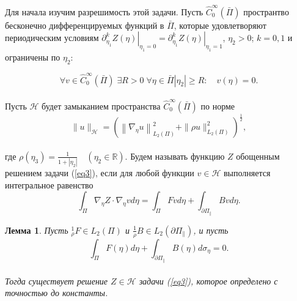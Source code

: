 \documentclass[12pt,titlepage]{report}
\newtheorem{lemma}{Лемма}
\begin{document}
Для начала изучим разрешимость этой задачи. Пусть $\widehat{C}_{0}^{\infty}(\bar{\Pi})$ пространтво бесконечно дифференцируемых функций в $\bar{\Pi}$, которые удовлетворяют периодическим условиям $\left.\partial_{\eta_{1}}^{k} Z(\eta)\right|_{\eta_{1}=0} =\left.\partial_{\eta_{1}}^{k} Z(\eta)\right|_{\eta_{1}=1}$, $\eta_{2}>0$; $k=0,1$ и ограничены по $\eta_{2}$:

$$\forall v \in \widehat{C}_{0}^{\infty}(\bar{\Pi}) \; \exists R>0 \; \forall \eta \in \bar{\Pi}\left|\eta_{2}\right| \geq R: \quad v(\eta)=0.$$\\
Пусть $\mathcal{H}$ будет замыканием пространства $\widehat{C}_{0}^{\infty}(\bar{\Pi})$ по норме 
$$\|u\|_{\mathcal{H}}=\left(\left\|\nabla_{\eta} u\right\|_{L_{2}(\Pi)}^{2}+\|\rho u\|_{L_{2}(\Pi)}^{2}\right)^{\frac{1}{2}},$$\\
где $\rho\left(\eta_{3}\right)=\frac{1}{1+\left|\eta_{2}\right|} \quad\left(\eta_{2} \in \mathbb{R}\right)$. Будем называть функцию $Z$ обощенным решением задачи (\ref{eq3}), если для любой функции $v \in \mathcal{H}$ выполняется интегральное равенство \\
$$\int_{\Pi} \nabla_{\eta} Z \cdot \nabla_{\eta} v d \eta=\int_{\Pi} F v d \eta+\int_{\partial \Pi_{\|}} B v d \eta.$$


\begin{lemma}
	\label{lem1}
	Пусть $_{\rho}^{1} F \in L_{2}(\Pi)$ и $\frac{1}{\rho} B \in L_{2}\left(\partial \Pi_{\|}\right)$, и пусть\\
	\begin{equation}
	\label{eq4}
		\int_{\Pi} F(\eta) d \eta+\int_{\partial \Pi_{\|}} B(\eta) d \sigma_{\eta}=0.
	\end{equation}\\
	Тогда существует решение $Z \in \mathcal{H}$ задачи (\ref{eq3}), которое определено с точностью до константы.
\end{lemma}
\end{document}
